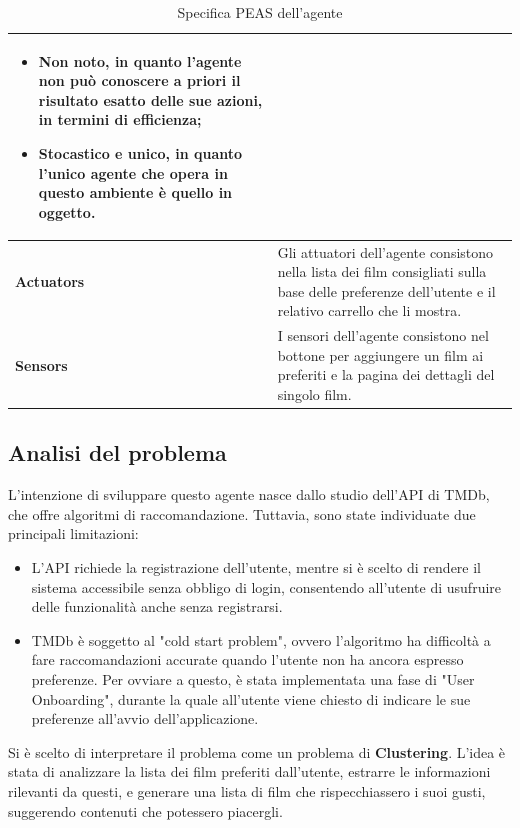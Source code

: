 \documentclass[a4paper,12pt]{article}
\begin{document}
\begin{table}[h!]
\begin{tabularx}{\textwidth}{|>{\columncolor[HTML]{CFE2F3}}l|X|}
\begin{itemize}
                              \item \textbf{Non noto}, in quanto l’agente non può conoscere a priori il risultato esatto delle sue azioni, in termini di efficienza;
                              \item \textbf{Stocastico e unico}, in quanto l’unico agente che opera in questo ambiente è quello in oggetto.
                            \end{itemize}            
                                                \\ \hline
        \textbf{Actuators}         & Gli attuatori dell’agente consistono nella lista dei film consigliati sulla base delle preferenze dell'utente e il relativo carrello che li mostra.                                                                                                                                                                                  					\\ \hline
        \textbf{Sensors}           & I sensori dell’agente consistono nel bottone per aggiungere un film ai preferiti e la pagina dei dettagli del singolo film.                                                                                                                                                                                                      					\\ \hline
    \end{tabularx}
    \caption{Specifica PEAS dell'agente}
\end{table}

   \newpage
\subsection{Analisi del problema}
	L'intenzione di sviluppare questo agente nasce dallo studio dell'API di TMDb, che offre algoritmi di raccomandazione. Tuttavia, sono state individuate due principali limitazioni:

		\begin{itemize}
			 \item L'API richiede la registrazione dell'utente, mentre si è scelto di rendere il sistema accessibile senza obbligo di login, consentendo all'utente di usufruire delle funzionalità anche senza registrarsi. 
			 \item TMDb è soggetto al "cold start problem", ovvero l'algoritmo ha difficoltà a fare raccomandazioni accurate quando l'utente non ha ancora espresso preferenze. Per ovviare a questo, è stata implementata una fase di "User Onboarding", durante la quale all'utente viene chiesto di indicare le sue preferenze all'avvio dell'applicazione.
		 \end{itemize}
Si è scelto di interpretare il problema come un problema di \textbf{Clustering}. L'idea è stata di analizzare la lista dei film preferiti dall'utente, estrarre le informazioni rilevanti da questi, e generare una lista di film che rispecchiassero i suoi gusti, suggerendo contenuti che potessero piacergli.
\end{document}
